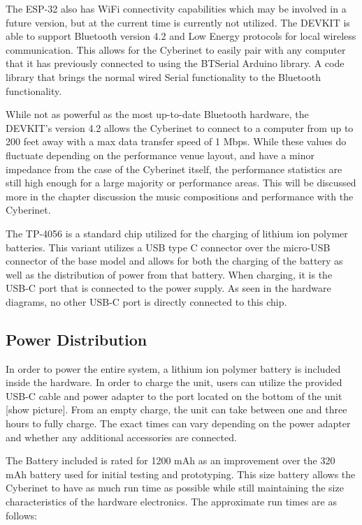 The ESP-32 also has WiFi connectivity capabilities which may be involved in a future version, but at the current time is currently not utilized. The DEVKIT is able to support Bluetooth version 4.2 and Low Energy protocols for local wireless communication. This allows for the Cyberinet to easily pair with any computer that it has previously connected to using the BTSerial Arduino library. A code library that brings the normal wired Serial functionality to the Bluetooth functionality.

While not as powerful as the most up-to-date Bluetooth hardware, the DEVKIT's version 4.2 allows the Cyberinet to connect to a computer from up to 200 feet away with a max data transfer speed of 1 Mbps. While these values do fluctuate depending on the performance venue layout, and have a minor impedance from the case of the Cyberinet itself, the performance statistics are still high enough for a large majority or performance areas. This will be discussed more in the chapter discussion the music compositions and performance with the Cyberinet. 


The TP-4056 is a standard chip utilized for the charging of lithium ion polymer batteries. This variant utilizes a USB type C connector over the micro-USB connector of the base model and allows for both the charging of the battery as well as the distribution of power from that battery. When charging, it is the USB-C port that is connected to the power supply. As seen in the hardware diagrams, no other USB-C port is directly connected to this chip.

\subsection{Power Distribution}
In order to power the entire system, a lithium ion polymer battery is included inside the hardware. In order to charge the unit, users can utilize the provided USB-C cable and power adapter to the port located on the bottom of the unit [show picture]. From an empty charge, the unit can take between one and three hours to fully charge. The exact times can vary depending on the power adapter and whether any additional accessories are connected. 

The Battery included is rated for 1200 mAh as an improvement over the 320 mAh battery used for initial testing and prototyping. This size battery allows the Cyberinet to have as much run time as possible while still maintaining the size characteristics of the hardware electronics. The approximate run times are as follows:

